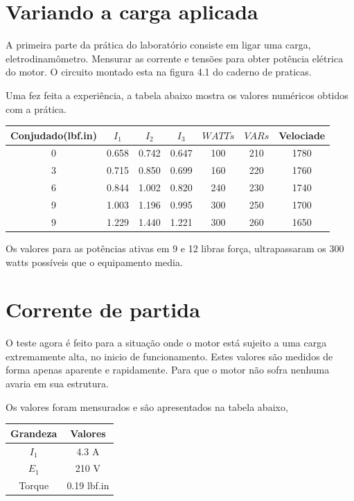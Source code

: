 \documentclass[10pt]{article}
\begin{document}
\section{Variando a carga aplicada}

A primeira parte da prática do laboratório consiste em ligar uma carga, eletrodinamômetro. 
Mensurar as corrente e tensões para obter potência elétrica do motor. O circuito montado esta na figura 4.1 do caderno de praticas. 

Uma fez feita a experiência, a tabela abaixo mostra os valores numéricos obtidos com a prática.

\begin{center}
    \begin{tabular}{c|c|c|c|c|c|c}
            Conjudado(lbf.in) & $I_1$ & $I_2$ & $I_3$ & $WATTs$ & $VARs$ & Velociade \\
            \hline
            0 & 0.658 & 0.742 & 0.647 & 100 & 210 & 1780 \\
            3 & 0.715 & 0.850 & 0.699 & 160 & 220 & 1760 \\
            6 & 0.844 & 1.002 & 0.820 & 240 & 230 & 1740 \\
            9 & 1.003 & 1.196 & 0.995 & 300 & 250 & 1700 \\
            9 & 1.229 & 1.440 & 1.221 & 300 & 260 & 1650 \\
    \end{tabular}
\end{center}

Os valores para as potências ativas em 9 e 12 libras força, ultrapassaram
os 300 watts possíveis que o equipamento media.

\section{Corrente de partida}

O teste agora é feito para a situação onde o motor está 
sujeito a uma carga extremamente alta, no inicio de funcionamento.
Estes valores são medidos de forma apenas aparente e rapidamente. 
Para que o motor não sofra nenhuma avaria em sua estrutura.

Os valores foram mensurados e são apresentados na tabela abaixo, 

\begin{center}
    \begin{tabular}{c|c}
        Grandeza & Valores \\
        \hline
        $I_1$ & 4.3 A \\
        $E_1$ & 210 V \\
        Torque & 0.19 lbf.in \\
    \end{tabular}
\end{center}
\end{document}
